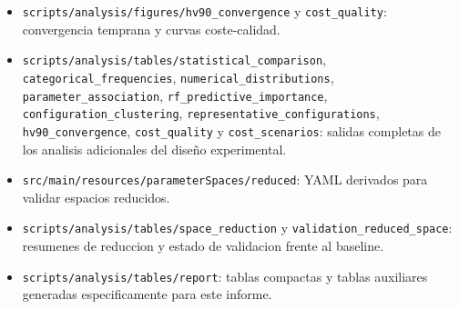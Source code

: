 \documentclass[11pt,a4paper]{article}
\begin{document}
\begin{itemize}
\item \texttt{scripts/analysis/figures/hv90\_convergence} y \texttt{cost\_quality}: convergencia temprana y curvas coste-calidad.

\item \texttt{scripts/analysis/tables/statistical\_comparison}, \texttt{categorical\_frequencies}, \texttt{numerical\_distributions}, \texttt{parameter\_association}, \texttt{rf\_predictive\_importance}, \texttt{configuration\_clustering}, \texttt{representative\_configurations}, \texttt{hv90\_convergence}, \texttt{cost\_quality} y \texttt{cost\_scenarios}: salidas completas de los analisis adicionales del dise\~no experimental.

\item \texttt{src/main/resources/parameterSpaces/reduced}: YAML derivados para validar espacios reducidos.

\item \texttt{scripts/analysis/tables/space\_reduction} y \texttt{validation\_reduced\_space}: resumenes de reduccion y estado de validacion frente al baseline.

\item \texttt{scripts/analysis/tables/report}: tablas compactas y tablas auxiliares generadas especificamente para este informe.

\end{itemize}
\end{document}

